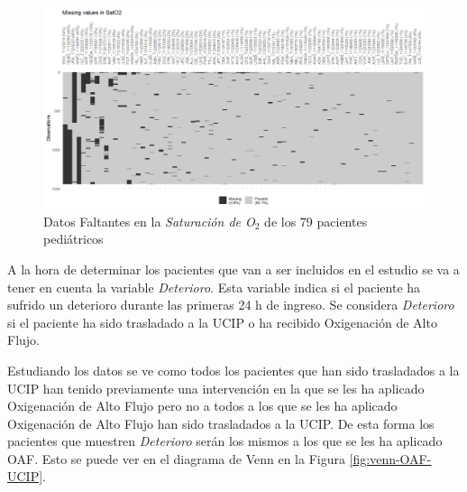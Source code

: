 \begin{landscape}

    \begin{figure}[H]
        \centering
        \includegraphics[scale = 0.9]{./img/missing-data-SatO2.png}
        \caption{Datos Faltantes en la \textit{Saturación de O$_2$} de los 79 pacientes pediátricos}
        \label{fig:missing-SatO2}
    \end{figure}
    
\end{landscape}
\restoregeometry 

 A la hora de determinar los pacientes que van a ser incluidos en el estudio se va a tener en cuenta la variable \textit{Deterioro}. Esta variable indica si el paciente ha sufrido un deterioro durante las primeras 24 h de ingreso. Se considera \textit{Deterioro} si el paciente ha sido trasladado a la UCIP o ha recibido Oxigenación de Alto Flujo. 

 Estudiando los datos se ve como todos los pacientes que han sido trasladados a la UCIP han tenido previamente una intervención en la que se les ha aplicado Oxigenación de Alto Flujo pero no a todos a los que se les ha aplicado Oxigenación de Alto Flujo han sido trasladados a la UCIP. De esta forma los pacientes que muestren \textit{Deterioro} serán los mismos a los que se les ha aplicado OAF. Esto se puede ver en el diagrama de Venn en la Figura \ref{fig:venn-OAF-UCIP}.

